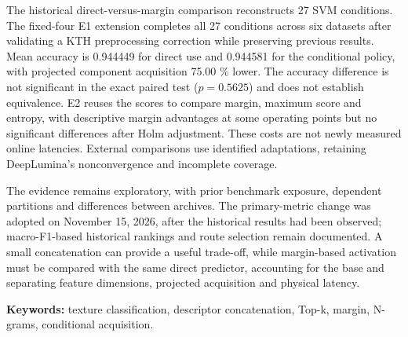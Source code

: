 \documentclass[12pt,a4paper]{report}
\begin{document}
The historical direct-versus-margin comparison reconstructs 27 SVM conditions. The fixed-four E1 extension completes all 27 conditions across six datasets after validating a KTH preprocessing correction while preserving previous results. Mean accuracy is 0.944449 for direct use and 0.944581 for the conditional policy, with projected component acquisition 75.00 \% lower. The accuracy difference is not significant in the exact paired test (\(p=0.5625\)) and does not establish equivalence. E2 reuses the scores to compare margin, maximum score and entropy, with descriptive margin advantages at some operating points but no significant differences after Holm adjustment. These costs are not newly measured online latencies. External comparisons use identified adaptations, retaining DeepLumina's nonconvergence and incomplete coverage.

The evidence remains exploratory, with prior benchmark exposure, dependent partitions and differences between archives. The primary-metric change was adopted on November 15, 2026, after the historical results had been observed; macro-F1-based historical rankings and route selection remain documented. A small concatenation can provide a useful trade-off, while margin-based activation must be compared with the same direct predictor, accounting for the base and separating feature dimensions, projected acquisition and physical latency.

\textbf{Keywords:} texture classification, descriptor concatenation, Top-k, margin, N-grams, conditional acquisition.
\end{document}
